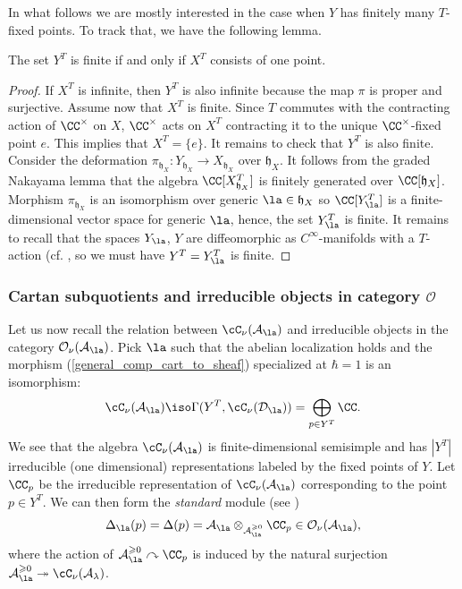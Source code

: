 \documentclass[12pt]{amsart}
\newcommand{\CO}{\mathcal{O}}
\begin{document}
In what follows we are mostly interested in the case when $Y$ has finitely many $T$-fixed points. To track that, we have the following lemma.
\begin{lemma}\label{finite fixed points}
 The set $Y^{T}$ is finite if and only if $X^T$ consists of one point.
\end{lemma}
\begin{proof}
If $X^T$ is infinite, then $Y^T$ is also infinite because the map $\pi$ is proper and surjective. Assume now that $X^T$ is finite. Since $T$ commutes with the contracting action of $\CC^\times$ on $X$, $\CC^\times$ acts on $X^T$ contracting it to the unique $\CC^\times$-fixed point $e$. This implies that $X^T=\{e\}$. It remains to check that $Y^T$ is also finite. Consider the deformation $\pi_{\mathfrak{h}_X}\colon Y_{\mathfrak{h}_X} \rightarrow X_{\mathfrak{h}_X}$ over $\mathfrak{h}_X$. It follows from the graded Nakayama lemma that the algebra $\CC[X_{\mathfrak{h}_X}^{T}]$ is finitely generated over $\CC[\mathfrak{h}_X]$. Morphism $\pi_{\mathfrak{h}_X}$ is an isomorphism over generic $\la \in \mathfrak{h}_X$ so $\CC[Y_{\la}^{T}]$ is a finite-dimensional vector space for generic $\la$, hence, the set $Y_{\la}^{T}$ is finite. It remains to recall that the spaces $Y_\la$, $Y$ are diffeomorphic as $C^\infty$-manifolds with a $T$-action (cf.  \cite[Section 1, Step 2 and references therein]{Namikawa2}, so we must have $Y^T=Y_\la^T$ is finite. 
\end{proof}


\subsubsection{Cartan subquotients and irreducible objects in category $\mathcal{O}$}\label{subsec_cartan_sub_and_irred}
Let us now recall the relation between $\cC_\nu(\mathcal{A}_{\la})$ and irreducible objects in the category $\CO_\nu(\mathcal{A}_\la)$. Pick $\la$ such that the abelian localization holds and the  morphism (\ref{general_comp_cart_to_sheaf}) specialized at $\hbar=1$ is an isomorphism:
\begin{equation*}
\cC_\nu(\mathcal{A}_{\la}) \iso \Gamma(Y^T,\cC_\nu(\mathcal{D}_\la))=\bigoplus_{p \in Y^T} \CC.
\end{equation*}
 We see that the algebra $\cC_\nu(\mathcal{A}_{\la})$ is finite-dimensional semisimple and has $|Y^T|$ irreducible (one dimensional) representations labeled by the fixed points of $Y$. Let $\CC_p$ be the irreducible representation of $\cC_\nu(\mathcal{A}_{\la})$ corresponding to the point $p \in Y^T$. We can then form the {\emph{standard}} module (see \cite[Section 5.2]{BPWII}) 
\begin{equation*}
\Delta_\la(p)=\Delta(p)=\mathcal{A}_\la \otimes_{\mathcal{A}_\la^{\geqslant 0}} \CC_p \in \CO_\nu(\mathcal{A}_\la),
\end{equation*}
where the action of $\mathcal{A}_\la^{\geqslant 0} \curvearrowright \CC_p$ is induced by the natural surjection $\mathcal{A}_\la^{\geqslant 0} \twoheadrightarrow \cC_\nu(\mathcal{A}_\lambda)$.
\end{document}
